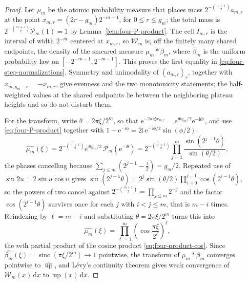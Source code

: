 \documentclass[11pt,oneside]{article}
\theoremstyle{definition}
\theoremstyle{remark}
\newcommand{\Up}{\operatorname{up}}
\newcommand{\sinc}{\operatorname{sinc}}
\newcommand{\e}{\mathrm e}
\newcommand{\ii}{\mathrm i}
\newcommand{\dd}{\,\mathrm d}
\begin{document}
\begin{proof}
Let $\mu_m$ be the atomic probability measure that places mass
$2^{-\binom{m+1}{2}}a_{m,r}$ at the point $x_{m,r}=(2r-g_m)2^{-m-1}$, for $0\le r\le g_m$;
the total mass is $2^{-\binom{m+1}{2}}\mathcal P_m(1)=1$ by Lemma~\ref{lem:four-P-product}.  The
cell $I_{m,r}$ is the interval of width $2^{-m}$ centered at $x_{m,r}$, so
$\mathcal W_m$ is, off the finitely many shared endpoints, the density of the smeared
measure
$\mu_m\ast\beta_m$, where $\beta_m$ is the uniform probability law on
$[-2^{-m-1},2^{-m-1}]$.  This proves the first equality in
\eqref{eq:four-step-normalizations}.  Symmetry and unimodality of $(a_{m,r})_r$, together
with $x_{m,g_m-r}=-x_{m,r}$, give evenness and the two monotonicity statements; the
half-weighted values at the shared endpoints lie between the neighboring plateau heights and
so do not disturb them.

For the transform, write $\theta=2\pi\xi/2^m$, so that
$\e^{-2\pi\ii\xi x_{m,r}}=\e^{\ii\theta g_m/2}\e^{-\ii\theta r}$, and use
\eqref{eq:four-P-product} together with
$1-\e^{-\ii\phi}=2\ii\,\e^{-\ii\phi/2}\sin(\phi/2)$:
\begin{equation*}
 \widehat{\mu_m}(\xi)
 =2^{-\binom{m+1}{2}}\e^{\ii\theta g_m/2}\,\mathcal P_m(\e^{-\ii\theta})
 =2^{-\binom{m+1}{2}}\prod_{j=1}^{m}\frac{\sin(2^{j-1}\theta)}{\sin(\theta/2)},
\end{equation*}
the phases cancelling because $\sum_{j\le m}(2^{j-1}-\tfrac12)=g_m/2$.  Repeated use of
$\sin2u=2\sin u\cos u$ gives
$\sin(2^{j-1}\theta)=2^{j}\sin(\theta/2)\prod_{i=0}^{j-1}\cos(2^{i-1}\theta)$, so the powers
of two cancel against $2^{-\binom{m+1}{2}}=\prod_{j\le m}2^{-j}$ and the factor
$\cos(2^{i-1}\theta)$ survives once for each $j$ with $i<j\le m$, that is $m-i$ times.
Reindexing by $\ell=m-i$ and substituting $\theta=2\pi\xi/2^m$ turns this into
\begin{equation}
 \widehat{\mu_m}(\xi)=\prod_{\ell=1}^{m}
 \left(\cos\frac{\pi\xi}{2^{\ell}}\right)^{\ell},         \label{eq:four-step-transform}
\end{equation}
the $m$th partial product of the cosine product \eqref{eq:four-product-cos}.  Since
$\widehat{\beta_m}(\xi)=\sinc(\pi\xi/2^m)\to1$ pointwise, the transform of
$\mu_m\ast\beta_m$ converges pointwise to $\widehat{\Up}$, and Lévy's continuity theorem
gives weak convergence of $\mathcal W_m(x)\dd x$ to $\Up(x)\dd x$.


\end{proof}
\end{document}
